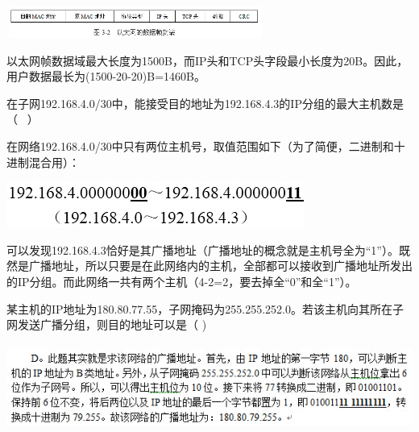 \includegraphics[width=3.33333in,height=0.40625in]{computerassets/25d66fd7ecf9a4aa73d66c4295ed68fb.png}
\par{}
\begin{solution}以太网帧数据域最大长度为1500B，而IP头和TCP头字段最小长度为20B。因此，用户数据最长为(1500-20-20)B=1460B。
\end{solution}
\question 在子网192.168.4.0/30中，能接受目的地址为192.168.4.3的IP分组的最大主机数是（
~）
\par{}
\begin{solution}在网络192.168.4.0/30中只有两位主机号，取值范围如下（为了简便，二进制和十进制混合用）：

\includegraphics[width=3.84375in,height=0.59375in]{computerassets/a6b4274f028044f3f47aca2ecffced63.jpeg}

可以发现192.168.4.3恰好是其广播地址（广播地址的概念就是主机号全为``1''）。既然是广播地址，所以只要是在此网络内的主机，全部都可以接收到广播地址所发出的IP分组。而此网络一共有两个主机（4-2=2，要去掉全``0''和全``1''）。
\end{solution}
\question 某主机的IP地址为180.80.77.55，子网掩码为255.255.252.0。若该主机向其所在子网发送广播分组，则目的地址可以是（
)
\par{}
\begin{solution}\includegraphics[width=5.98958in,height=1.12500in]{computerassets/9c47546d83511a0705eea3616ef8d8a5.jpeg}
\end{solution}
